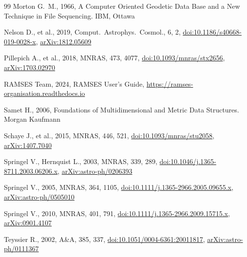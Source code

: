 \documentclass[fleqn,usenatbib]{mnras}
\begin{document}
\begin{thebibliography}{99}
Morton G.~M., 1966, A Computer Oriented Geodetic Data Base and a
New Technique in File Sequencing. IBM, Ottawa

Nelson D., et al., 2019, Comput.\ Astrophys.\ Cosmol., 6, 2,
\href{https://doi.org/10.1186/s40668-019-0028-x}{doi:10.1186/s40668-019-0028-x},
\href{https://arxiv.org/abs/1812.05609}{arXiv:1812.05609}

Pillepich A., et al., 2018, MNRAS, 473, 4077,
\href{https://doi.org/10.1093/mnras/stx2656}{doi:10.1093/mnras/stx2656},
\href{https://arxiv.org/abs/1703.02970}{arXiv:1703.02970}

{RAMSES Team}, 2024, RAMSES User's Guide,
\url{https://ramses-organisation.readthedocs.io}

Samet H., 2006, Foundations of Multidimensional and Metric Data Structures. Morgan Kaufmann

Schaye J., et al., 2015, MNRAS, 446, 521,
\href{https://doi.org/10.1093/mnras/stu2058}{doi:10.1093/mnras/stu2058},
\href{https://arxiv.org/abs/1407.7040}{arXiv:1407.7040}

Springel V., Hernquist L., 2003, MNRAS, 339, 289,
\href{https://doi.org/10.1046/j.1365-8711.2003.06206.x}{doi:10.1046/j.1365-8711.2003.06206.x},
\href{https://arxiv.org/abs/astro-ph/0206393}{arXiv:astro-ph/0206393}

Springel V., 2005, MNRAS, 364, 1105,
\href{https://doi.org/10.1111/j.1365-2966.2005.09655.x}{doi:10.1111/j.1365-2966.2005.09655.x},
\href{https://arxiv.org/abs/astro-ph/0505010}{arXiv:astro-ph/0505010}

Springel V., 2010, MNRAS, 401, 791,
\href{https://doi.org/10.1111/j.1365-2966.2009.15715.x}{doi:10.1111/j.1365-2966.2009.15715.x},
\href{https://arxiv.org/abs/0901.4107}{arXiv:0901.4107}

Teyssier R., 2002, A\&A, 385, 337,
\href{https://doi.org/10.1051/0004-6361:20011817}{doi:10.1051/0004-6361:20011817},
\href{https://arxiv.org/abs/astro-ph/0111367}{arXiv:astro-ph/0111367}


\end{thebibliography}
\end{document}
